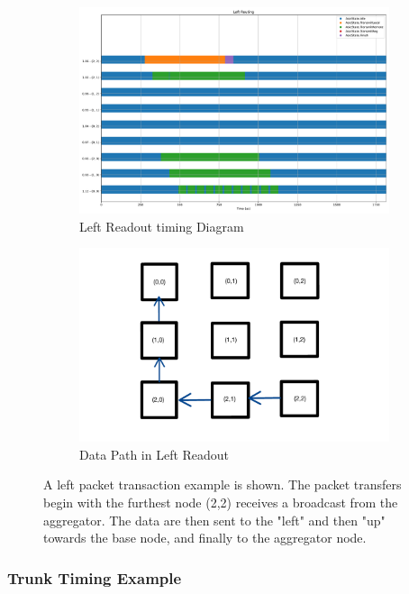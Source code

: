 \begin{figure}
\centering
\begin{subfigure}{.5\textwidth}
  \centering
  \includegraphics[width=\textwidth]{images/left_timer.pdf}
  \caption{Left Readout timing Diagram}
\end{subfigure}%
\begin{subfigure}{.5\textwidth}
  \centering
  \includegraphics[width=\textwidth]{images/left_ex_read.pdf}
  \caption{Data Path in Left Readout}
\end{subfigure}
\caption{A left packet transaction example is shown. The packet transfers begin with the furthest node (2,2) receives a broadcast from the aggregator. 
The data are then sent to the "left" and then "up" towards the base node, and finally to the aggregator node.}
\label{fig:left_packet_drift}
\end{figure}


\subsubsection{Trunk Timing Example}

